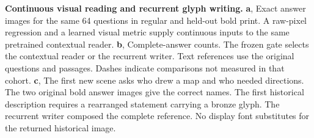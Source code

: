 \textbf{Continuous visual reading and recurrent glyph writing.}
\textbf{a}, Exact answer images for the same 64 questions in regular and held-out bold print. A raw-pixel regression and a learned visual metric supply continuous inputs to the same pretrained contextual reader.
\textbf{b}, Complete-answer counts. The frozen gate selects the contextual reader or the recurrent writer. Text references use the original questions and passages. Dashes indicate comparisons not measured in that cohort.
\textbf{c}, The first new scene asks who drew a map and who needed directions. The two original bold answer images give the correct names. The first historical description requires a rearranged statement carrying a bronze glyph. The recurrent writer composed the complete reference. No display font substitutes for the returned historical image.
